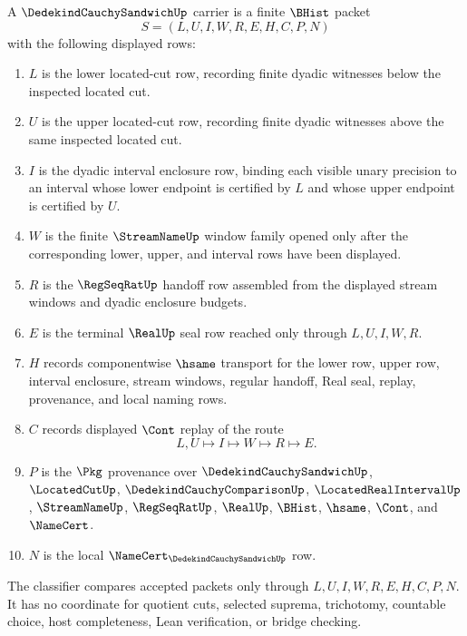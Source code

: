 \begin{definition}
\label{def:dedekind-cauchy-sandwich-carrier}
A $\DedekindCauchySandwichUp$ carrier is a finite $\BHist$ packet
$$
S=(L,U,I,W,R,E,H,C,P,N)
$$
with the following displayed rows:
\begin{enumerate}
\item $L$ is the lower located-cut row, recording finite dyadic witnesses below the inspected located cut.
\item $U$ is the upper located-cut row, recording finite dyadic witnesses above the same inspected located cut.
\item $I$ is the dyadic interval enclosure row, binding each visible unary precision to an interval whose lower endpoint is certified by $L$ and whose upper endpoint is certified by $U$.
\item $W$ is the finite $\StreamNameUp$ window family opened only after the corresponding lower, upper, and interval rows have been displayed.
\item $R$ is the $\RegSeqRatUp$ handoff row assembled from the displayed stream windows and dyadic enclosure budgets.
\item $E$ is the terminal $\RealUp$ seal row reached only through $L,U,I,W,R$.
\item $H$ records componentwise $\hsame$ transport for the lower row, upper row, interval enclosure, stream windows, regular handoff, Real seal, replay, provenance, and local naming rows.
\item $C$ records displayed $\Cont$ replay of the route
$$
L,U \longmapsto I \longmapsto W \longmapsto R \longmapsto E .
$$
\item $P$ is the $\Pkg$ provenance over $\DedekindCauchySandwichUp$, $\LocatedCutUp$, $\DedekindCauchyComparisonUp$, $\LocatedRealIntervalUp$, $\StreamNameUp$, $\RegSeqRatUp$, $\RealUp$, $\BHist$, $\hsame$, $\Cont$, and $\NameCert$.
\item $N$ is the local $\NameCert_{\DedekindCauchySandwichUp}$ row.
\end{enumerate}
The classifier compares accepted packets only through $L,U,I,W,R,E,H,C,P,N$. It has no coordinate for quotient cuts, selected suprema, trichotomy, countable choice, host completeness, Lean verification, or bridge checking.
\end{definition}

